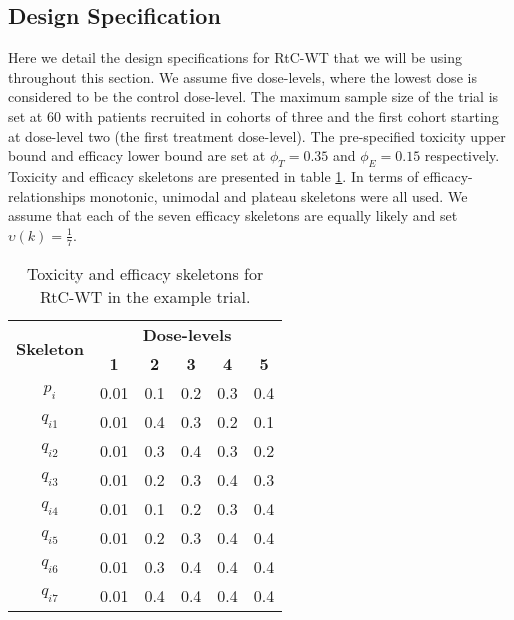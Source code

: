  \subsection{Design Specification}
 \label{WT:Design-Spec}
 
 Here we detail the design specifications for RtC-WT that we will be using throughout this section. We assume five dose-levels, where the lowest dose is considered to be the control dose-level. The maximum sample size of the trial is set at 60 with patients recruited in cohorts of three and the first cohort starting at dose-level two (the first treatment dose-level). The pre-specified toxicity upper bound and efficacy lower bound are set at $\phi_T = 0.35$ and $\phi_E = 0.15$ respectively. Toxicity and efficacy skeletons are presented in table \ref{tab_wt:tox-eff-skeleton}. In terms of efficacy-relationships monotonic, unimodal and plateau skeletons were all used. We assume that each of the seven efficacy skeletons are equally likely and set $\upsilon(k) = \frac{1}{7}$. 
 

 \begin{table}[!h]
 	\centering
 	\caption{Toxicity and efficacy skeletons for RtC-WT in the example trial.}
 	\label{tab_wt:tox-eff-skeleton}
 	\begin{tabular}{c|ccccc}
 		\hline
 		\multicolumn{1}{c|}{\multirow{2}{*}{\textbf{Skeleton}}} & \multicolumn{5}{c}{\textbf{Dose-levels}}                       \\
 		\multicolumn{1}{c|}{}                                   & \textbf{1} & \textbf{2} & \textbf{3} & \textbf{4} & \textbf{5} \\ \hline
 		$p_i$    & 0.01 & 0.1 & 0.2 & 0.3 & 0.4 \\
 		$q_{i1}$ & 0.01 & 0.4 & 0.3 & 0.2 & 0.1 \\
 		$q_{i2}$ & 0.01 & 0.3 & 0.4 & 0.3 & 0.2 \\
 		$q_{i3}$ & 0.01 & 0.2 & 0.3 & 0.4 & 0.3 \\
 		$q_{i4}$ & 0.01 & 0.1 & 0.2 & 0.3 & 0.4 \\
 		$q_{i5}$ & 0.01 & 0.2 & 0.3 & 0.4 & 0.4 \\
 		$q_{i6}$ & 0.01 & 0.3 & 0.4 & 0.4 & 0.4 \\
 		$q_{i7}$ & 0.01 & 0.4 & 0.4 & 0.4 & 0.4 \\ \hline
 	\end{tabular}
 \end{table}
 
